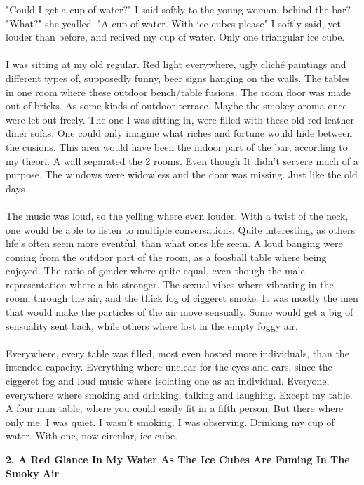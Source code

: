 \documentclass[]{article}
\begin{document}
	"Could I get a cup of water?" I said softly to the young woman, behind the bar?
	"What?" she yealled.
	"A cup of water. With ice cubes please" I softly said, yet louder than before, and recived my cup of water. Only one triangular ice cube.
	\\ \\
	I was sitting at my old regular. Red light everywhere, ugly cliché paintings and different types of, supposedly funny, beer signs hanging on the walls. The tables in one room where these outdoor bench/table fusions. The room floor was made out of bricks. As some kinds of outdoor terrace. Maybe the smokey aroma once were let out freely. The one I was sitting in, were filled with these old red leather diner sofas. One could only imagine what riches and fortune would hide between the cusions. This area would have been the indoor part of the bar, according to my theori. A wall separated the 2 rooms. Even though It didn't  servere much of a purpose. The windows were widowless and the door was missing. Just like the old days
	\\ \\
	The music was loud, so the yelling where even louder. With a twist of the neck, one would be able to listen to multiple conversations. Quite interesting, as others life's often seem more eventful, than what ones life seem. A loud banging were coming from the outdoor part of the room, as a foosball table where being enjoyed. The ratio of gender where quite equal, even though the male representation where a bit stronger. The sexual vibes where vibrating in the room, through the air, and the thick fog of ciggeret smoke. It was mostly the men that would make the particles of the air move sensually. Some would get a big of sensuality sent back, while others where lost in the empty foggy air. 
	\\ \\
	Everywhere, every table was filled, most even hosted more individuals, than the intended capacity. Everything where unclear for the eyes and ears, since the ciggeret fog and loud music where isolating one as an individual. Everyone, everywhere where smoking and drinking, talking and laughing. Except my table. A four man table, where you could easily fit in a fifth person. But there where only me. I was quiet. I wasn't smoking. I was observing. Drinking my cup of water. With one, now circular, ice cube.
	
	\newpage
	
	\begin{center}
		\large\textbf{2. A Red Glance In My Water As \newline The Ice Cubes Are Fuming In The Smoky Air}
	\end{center}
	
\end{document}
